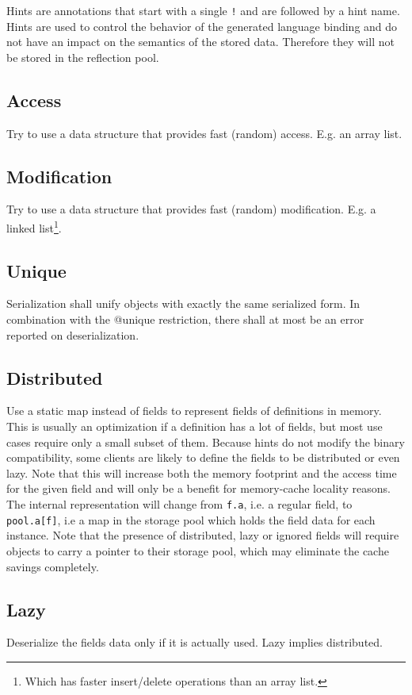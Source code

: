 Hints are annotations that start with a single \verb/!/ and are followed by a hint name. Hints are used to control the behavior of the generated language binding and do not have an impact on the semantics of the stored data. Therefore they will not be stored in the reflection pool.

\subsection*{Access}
Try to use a data structure that provides fast (random) access. E.g. an array list.

\subsection*{Modification}
Try to use a data structure that provides fast (random) modification. E.g. a linked list\footnote{Which has faster insert/delete operations than an array list.}.

\subsection*{Unique}
Serialization shall unify objects with exactly the same serialized form. In combination with the @unique restriction, there shall at most be an error reported on deserialization.

\subsection*{Distributed}
Use a static map instead of fields to represent fields of definitions in memory. This is usually an optimization if a definition has a lot of fields, but most use cases require only a small subset of them. Because hints do not modify the binary compatibility, some clients are likely to define the fields to be distributed or even lazy. Note that this will increase both the memory footprint and the access time for the given field and will only be a benefit for memory-cache locality reasons. The internal representation will change from \texttt{f.a}, i.e. a regular field, to \texttt{pool.a[f]}, i.e a map in the storage pool which holds the field data for each instance. Note that the presence of distributed, lazy or ignored fields will require objects to carry a pointer to their storage pool, which may eliminate the cache savings completely.

\subsection*{Lazy}
Deserialize the fields data only if it is actually used. Lazy implies distributed.

